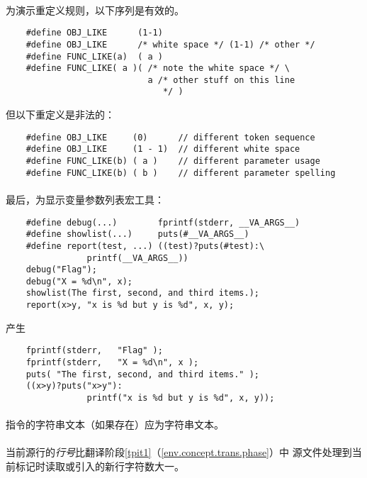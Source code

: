 \paragraph{}
\ex 为演示重定义规则，以下序列是有效的。
\begin{lstlisting}
    #define OBJ_LIKE      (1-1)
    #define OBJ_LIKE      /* white space */ (1-1) /* other */
    #define FUNC_LIKE(a)  ( a )
    #define FUNC_LIKE( a )( /* note the white space */ \
                            a /* other stuff on this line
                               */ )
\end{lstlisting}
但以下重定义是非法的：
\begin{lstlisting}
    #define OBJ_LIKE     (0)      // different token sequence
    #define OBJ_LIKE     (1 - 1)  // different white space
    #define FUNC_LIKE(b) ( a )    // different parameter usage
    #define FUNC_LIKE(b) ( b )    // different parameter spelling
\end{lstlisting}

\paragraph{}
\ex 最后，为显示变量参数列表宏工具：
\begin{lstlisting}
    #define debug(...)        fprintf(stderr, __VA_ARGS__)
    #define showlist(...)     puts(#__VA_ARGS__)
    #define report(test, ...) ((test)?puts(#test):\
                printf(__VA_ARGS__))
    debug("Flag");
    debug("X = %d\n", x);
    showlist(The first, second, and third items.);
    report(x>y, "x is %d but y is %d", x, y);
\end{lstlisting}
产生
\begin{lstlisting}
    fprintf(stderr,   "Flag" );
    fprintf(stderr,   "X = %d\n", x );
    puts( "The first, second, and third items." );
    ((x>y)?puts("x>y"):
                printf("x is %d but y is %d", x, y));
\end{lstlisting}

\constraint
\paragraph{}
指令的字符串文本（如果存在）应为字符串文本。

\semantic
\paragraph{}
当前源行的\textit{行号}比翻译阶段\ref{tpit1}（\ref{env.concept.trans.phase}）中
源文件处理到当前标记时读取或引入的新行字符数大一。

